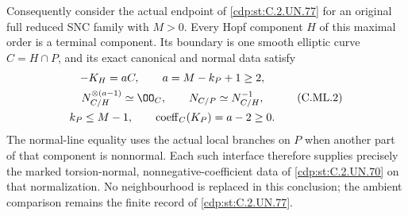 \begin{proposition}
Consequently consider the actual endpoint of \ref{cdp:st:C.2.UN.77} for
an original full reduced SNC family with \(M>0\).
Every Hopf component \(H\) of this maximal order is a
terminal component. Its boundary is one smooth elliptic
curve \(C=H\cap P\), and its exact canonical and normal
data satisfy
\[
 \begin{gathered}
       -K_H=aC,\qquad a=M-k_P+1\ge2,\\
       N_{C/H}^{\otimes(a-1)}\simeq\OO_C,
       \qquad N_{C/P}\simeq N_{C/H}^{-1},\\
       k_P\le M-1,\qquad
       \operatorname{coeff}_C(K_P)=a-2\ge0 .
 \end{gathered}
\tag{C.ML.2}\label{cdp:eq:C.ML.2}
\]
The normal-line equality uses the actual local branches
on \(P\) when another part of that component is nonnormal.
Each such interface therefore supplies precisely the
marked torsion-normal, nonnegative-coefficient data of
\ref{cdp:st:C.2.UN.70} on that normalization. No neighbourhood is replaced
in this conclusion; the ambient comparison remains the
finite record of \ref{cdp:st:C.2.UN.77}.
\end{proposition}

